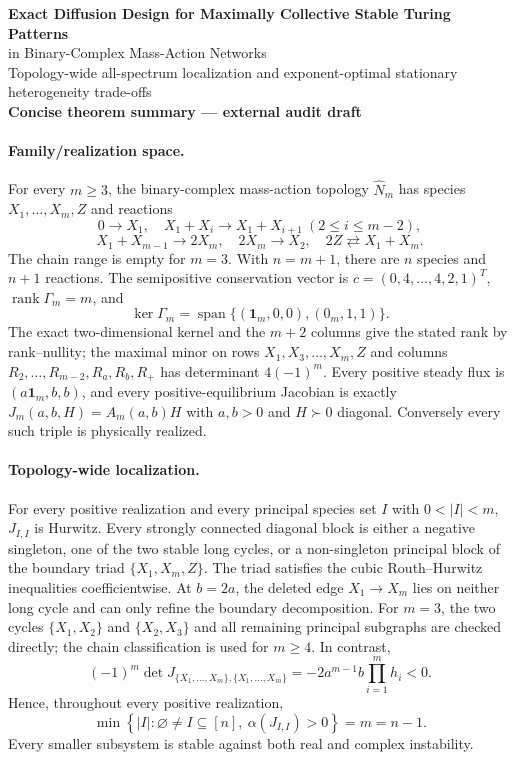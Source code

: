 \documentclass[10pt]{article}
\begin{document}
\begin{center}
{\Large\bf Exact Diffusion Design for Maximally Collective Stable Turing Patterns}\\[2pt]
{\large in Binary-Complex Mass-Action Networks}\\[2pt]
{\normalsize Topology-wide all-spectrum localization and exponent-optimal stationary heterogeneity trade-offs}\\[5pt]
{\bf Concise theorem summary --- external audit draft}
\end{center}

\paragraph{Family/realization space.}
For every $m\ge3$, the binary-complex mass-action topology $\widehat N_m$ has species $X_1,\ldots,X_m,Z$ and reactions
\[
0\to X_1,\quad X_1+X_i\to X_1+X_{i+1}\ (2\le i\le m-2),
\]
\[
X_1+X_{m-1}\to2X_m,\quad 2X_m\to X_2,
\quad 2Z\rightleftarrows X_1+X_m.
\]
The chain range is empty for $m=3$. With $n=m+1$, there are $n$ species and $n+1$ reactions. The semipositive conservation vector is $c=(0,4,\ldots,4,2,1)^T$, $\operatorname{rank}\Gamma_m=m$, and
\[
\ker\Gamma_m=\operatorname{span}\{(\mathbf1_m,0,0),(0_m,1,1)\}.
\]
The exact two-dimensional kernel and the $m+2$ columns give the stated rank by
rank--nullity; the maximal minor on rows $X_1,X_3,\ldots,X_m,Z$ and columns
$R_2,\ldots,R_{m-2},R_a,R_b,R_+$ has determinant $4(-1)^m$.
Every positive steady flux is $(a\mathbf1_m,b,b)$, and every positive-equilibrium Jacobian is exactly $J_m(a,b,H)=A_m(a,b)H$ with $a,b>0$ and $H\succ0$ diagonal. Conversely every such triple is physically realized.

\paragraph{Topology-wide localization.}
For every positive realization and every principal species set $I$ with $0<|I|<m$, $J_{I,I}$ is Hurwitz. Every strongly connected diagonal block is either a negative singleton, one of the two stable long cycles, or a non-singleton principal block of the boundary triad $\{X_1,X_m,Z\}$. The triad satisfies the cubic Routh--Hurwitz inequalities coefficientwise.  At $b=2a$, the deleted edge $X_1\to X_m$ lies on neither long cycle and can only refine the boundary decomposition.
For $m=3$, the two cycles $\{X_1,X_2\}$ and $\{X_2,X_3\}$ and all remaining
principal subgraphs are checked directly; the chain classification is used
for $m\ge4$.  In contrast,
\[
(-1)^m\det J_{\{X_1,\ldots,X_m\},\{X_1,\ldots,X_m\}}
=-2a^{m-1}b\prod_{i=1}^m h_i<0.
\]
Hence, throughout every positive realization,
\[
\min\left\{|I|:\varnothing\ne I\subseteq[n],\
\alpha(J_{I,I})>0\right\}=m=n-1.
\]
Every smaller subsystem is stable against both real and complex instability.
\end{document}
